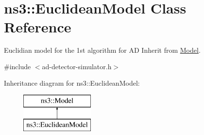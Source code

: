 \hypertarget{classns3_1_1EuclideanModel}{}\section{ns3\+:\+:Euclidean\+Model Class Reference}
\label{classns3_1_1EuclideanModel}


Euclidian model for the 1st algorithm for A\+D Inherit from \hyperlink{classns3_1_1Model}{Model}.  




{\ttfamily \#include $<$ad-\/detector-\/simulator.\+h$>$}

Inheritance diagram for ns3\+:\+:Euclidean\+Model\+:\begin{figure}[H]
\begin{center}
\leavevmode
\includegraphics[height=2.000000cm]{classns3_1_1EuclideanModel}
\end{center}
\end{figure}
